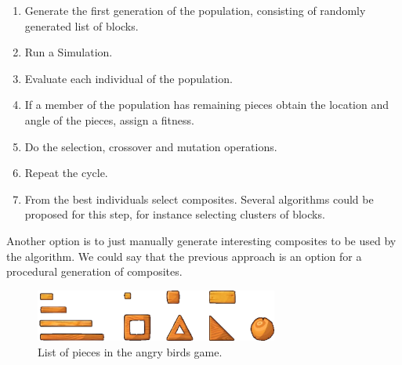 \documentclass[conference]{IEEEtran}
\begin{document}
    
    
    \begin{enumerate}
    \item Generate the first generation of the population, consisting of
    randomly generated list of blocks.
    \item Run a Simulation.
    \item Evaluate each individual of the population.
    \item If a member of the population has remaining pieces obtain the location
    and angle of the pieces, assign a fitness.
    \item Do the selection, crossover and mutation operations.
    \item Repeat the cycle.
    \item From the best individuals select composites. Several algorithms could
    be proposed for this step, for instance selecting clusters of blocks.
    \end{enumerate}
    
    Another option is to just manually generate interesting composites to be used by the algorithm.
    We could say that the previous approach is an option for a procedural generation of composites.

    \begin{figure}[htbp]
    \centerline{\includegraphics[width=80mm]{Images/list_pieces.png}}
    \caption{List of pieces in the angry birds game.}
    \label{piece_list}
    \end{figure}
    
    
\end{document}
